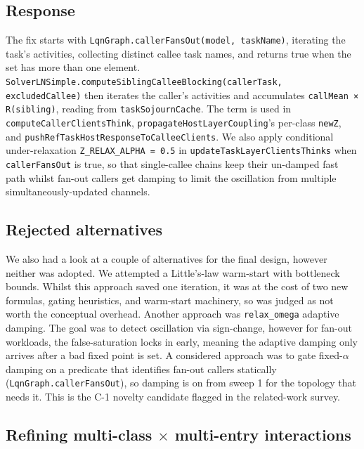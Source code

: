 \subsection{Response}

The fix starts with \texttt{LqnGraph.callerFansOut(model, taskName)}, iterating the task's activities, collecting distinct callee task names, and returns true when the set has more than one element. \texttt{SolverLNSimple.computeSiblingCalleeBlocking(callerTask, excludedCallee)} then iterates the caller's activities and accumulates \texttt{callMean × R(sibling)}, reading from \texttt{taskSojournCache}. The term is used in \texttt{computeCallerClientsThink}, \texttt{propagateHostLayerCoupling}'s per-class \texttt{newZ}, and \texttt{pushRefTaskHostResponseToCalleeClients}. 
We also apply conditional under-relaxation \texttt{Z\_RELAX\_ALPHA = 0.5} in \texttt{updateTaskLayerClientsThinks} when \texttt{callerFansOut} is true, so that single-callee chains keep their un-damped fast path whilst fan-out callers get damping to limit the oscillation from multiple simultaneously-updated channels.

\subsection{Rejected alternatives}

We also had a look at a couple of alternatives for the final design, however neither was adopted. We attempted a Little's-law warm-start with bottleneck bounds. Whilst this approach saved one iteration, it was at the cost of two new formulas, gating heuristics, and warm-start machinery, so was judged as not worth the conceptual overhead. Another approach was \texttt{relax\_omega} adaptive damping. The goal was to detect oscillation via sign-change, however for fan-out workloads, the false-saturation locks in early, meaning the adaptive damping only arrives after a bad fixed point is set. A considered approach was to gate fixed-$\alpha$ damping on a predicate that identifies fan-out callers statically (\texttt{LqnGraph.callerFansOut}), so damping is on from sweep 1 for the topology that needs it. This is the C-1 novelty candidate flagged in the related-work survey.

\subsection{Refining multi-class \texorpdfstring{$\times$}{x} multi-entry interactions}


